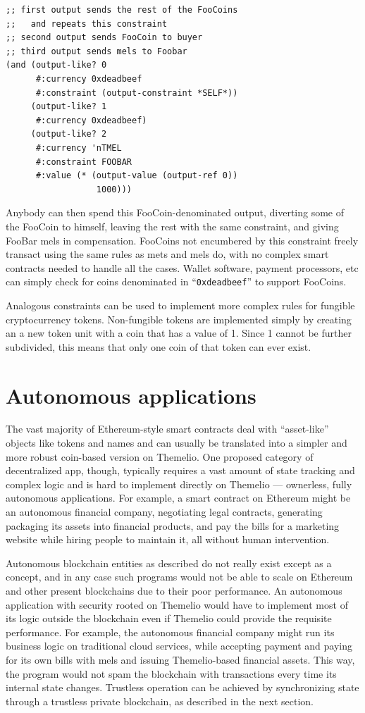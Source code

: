\documentclass[headinclude]{scrbook}
\begin{document}
\begin{lstlisting}
;; first output sends the rest of the FooCoins
;;   and repeats this constraint
;; second output sends FooCoin to buyer
;; third output sends mels to Foobar
(and (output-like? 0
      #:currency 0xdeadbeef
      #:constraint (output-constraint *SELF*))
     (output-like? 1
      #:currency 0xdeadbeef)
     (output-like? 2
      #:currency 'nTMEL
      #:constraint FOOBAR
      #:value (* (output-value (output-ref 0))
                  1000)))
\end{lstlisting}

Anybody can then spend this FooCoin-denominated output, diverting some of the FooCoin to himself, leaving the rest with the same constraint, and giving FooBar mels in compensation. FooCoins not encumbered by this constraint freely transact using the same rules as mets and mels do, with no complex smart contracts needed to handle all the cases. Wallet software, payment processors, etc can simply check for coins denominated in ``\texttt{0xdeadbeef}'' to support FooCoins.

Analogous constraints can be used to implement more complex rules for fungible cryptocurrency tokens. Non-fungible tokens are implemented simply by creating an a new token unit with a coin that has a value of 1. Since 1 cannot be further subdivided, this means that only one coin of that token can ever exist.  

\section{Autonomous applications}

The vast majority of Ethereum-style smart contracts deal with ``asset-like'' objects like tokens and names and can usually be translated into a simpler and more robust coin-based version on Themelio. One proposed category of decentralized app, though, typically requires a vast amount of state tracking and complex logic and is hard to implement directly on Themelio --- ownerless, fully autonomous applications. For example, a smart contract on Ethereum might be an autonomous financial company, negotiating legal contracts, generating packaging its assets into financial products, and pay the bills for a marketing website while hiring people to maintain it, all without human intervention.

Autonomous blockchain entities as described do not really exist except as a concept, and in any case such programs would not be able to scale on Ethereum and other present blockchains due to their poor performance. An autonomous application with security rooted on Themelio would have to implement most of its logic outside the blockchain even if Themelio could provide the requisite performance. For example, the autonomous financial company might run its business logic on traditional cloud services, while accepting payment and paying for its own bills with mels and issuing Themelio-based financial assets. This way, the program would not spam the blockchain with transactions every time its internal state changes. Trustless operation can be achieved by synchronizing state through a trustless private blockchain, as described in the next section.
\end{document}
